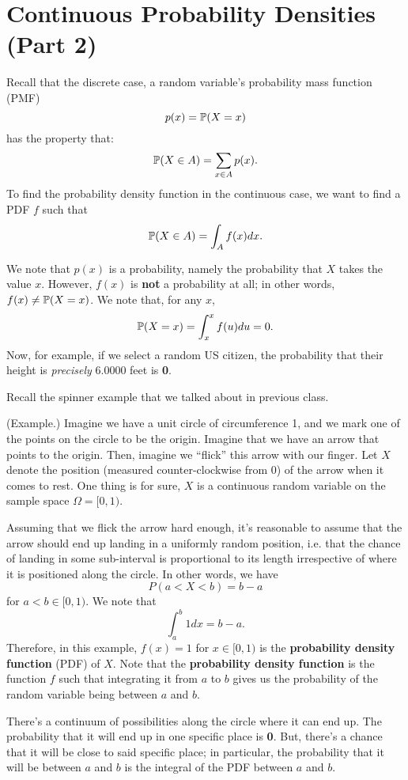 \documentclass[letterpaper]{article}
\begin{document}
\section{Continuous Probability Densities (Part 2)}
Recall that the discrete case, a random variable's probability mass function (PMF)
\[p(x) = \mathbb{P}(X = x)\]
has the property that: 
\[\mathbb{P}(X \in A) = \sum_{x \in A} p(x).\]
To find the probability density function in the continuous case, we want to find a PDF $f$ such that 
\[\mathbb{P}(X \in A) = \int_A f(x) dx.\]

We note that $p(x)$ is a probability, namely the probability that $X$ takes the value $x$. However, $f(x)$ is \textbf{not} a probability at all; in other words, $f(x) \neq \mathbb{P}(X = x)$. We note that, for any $x$,
\[\mathbb{P}(X = x) = \int_{x}^{x} f(u) du = 0.\]
Now, for example, if we select a random US citizen, the probability that their height is \emph{precisely} 6.0000 feet is \textbf{0}.

\bigskip 

Recall the spinner example that we talked about in previous class. 
\begin{mdframed}[]
    (Example.) Imagine we have a unit circle of circumference 1, and we mark one of the points on the circle to be the origin. Imagine that we have an arrow that points to the origin. Then, imagine we ``flick'' this arrow with our finger. Let $X$ denote the position (measured counter-clockwise from 0) of the arrow when it comes to rest. One thing is for sure, $X$ is a continuous random variable on the sample space $\Omega = [0, 1)$.

    \bigskip 

    Assuming that we flick the arrow hard enough, it's reasonable to assume that the arrow should end up landing in a uniformly random position, i.e. that the chance of landing in some sub-interval is proportional to its length irrespective of where it is positioned along the circle. In other words, we have 
    \[P(a < X < b) = b - a\]
    for $a < b \in [0, 1)$. We note that 
    \[\int_a^b 1dx = b - a.\]
    Therefore, in this example, $f(x) = 1$ for $x \in [0, 1)$ is the \textbf{probability density function} (PDF) of $X$. Note that the \textbf{probability density function} is the function $f$ such that integrating it from $a$ to $b$ gives us the probability of the random variable being between $a$ and $b$. 
\end{mdframed}
There's a continuum of possibilities along the circle where it can end up. The probability that it will end up in one specific place is \textbf{0}. But, there's a chance that it will be close to said specific place; in particular, the probability that it will be between $a$ and $b$ is the integral of the PDF between $a$ and $b$. 
\end{document}

